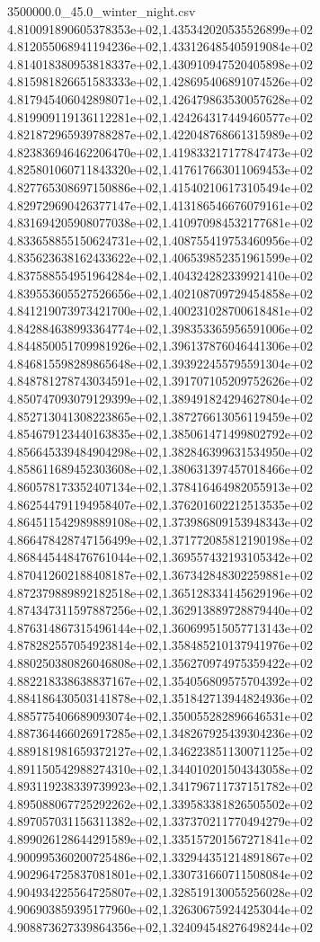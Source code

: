\begin{filecontents*}{3500000.0_45.0_winter_night.csv}
4.810091890605378353e+02,1.435342020535526899e+02
4.812055068941194236e+02,1.433126485405919084e+02
4.814018380953818337e+02,1.430910947520405898e+02
4.815981826651583333e+02,1.428695406891074526e+02
4.817945406042898071e+02,1.426479863530057628e+02
4.819909119136112281e+02,1.424264317449460577e+02
4.821872965939788287e+02,1.422048768661315989e+02
4.823836946462206470e+02,1.419833217177847473e+02
4.825801060711843320e+02,1.417617663011069453e+02
4.827765308697150886e+02,1.415402106173105494e+02
4.829729690426377147e+02,1.413186546676079161e+02
4.831694205908077038e+02,1.410970984532177681e+02
4.833658855150624731e+02,1.408755419753460956e+02
4.835623638162433622e+02,1.406539852351961599e+02
4.837588554951964284e+02,1.404324282339921410e+02
4.839553605527526656e+02,1.402108709729454858e+02
4.841219073973421700e+02,1.400231028700618481e+02
4.842884638993364774e+02,1.398353365956591006e+02
4.844850051709981926e+02,1.396137876046441306e+02
4.846815598289865648e+02,1.393922455795591304e+02
4.848781278743034591e+02,1.391707105209752626e+02
4.850747093079129399e+02,1.389491824294627804e+02
4.852713041308223865e+02,1.387276613056119459e+02
4.854679123440163835e+02,1.385061471499802792e+02
4.856645339484904298e+02,1.382846399631534950e+02
4.858611689452303608e+02,1.380631397457018466e+02
4.860578173352407134e+02,1.378416464982055913e+02
4.862544791194958407e+02,1.376201602212513535e+02
4.864511542989889108e+02,1.373986809153948343e+02
4.866478428747156499e+02,1.371772085812190198e+02
4.868445448476761044e+02,1.369557432193105342e+02
4.870412602188408187e+02,1.367342848302259881e+02
4.872379889892182518e+02,1.365128334145629196e+02
4.874347311597887256e+02,1.362913889728879440e+02
4.876314867315496144e+02,1.360699515057713143e+02
4.878282557054923814e+02,1.358485210137941976e+02
4.880250380826046808e+02,1.356270974975359422e+02
4.882218338638837167e+02,1.354056809575704392e+02
4.884186430503141878e+02,1.351842713944824936e+02
4.885775406689093074e+02,1.350055282896646531e+02
4.887364466026917285e+02,1.348267925439304236e+02
4.889181981659372127e+02,1.346223851130071125e+02
4.891150542988274310e+02,1.344010201504343058e+02
4.893119238339739923e+02,1.341796711737151782e+02
4.895088067725292262e+02,1.339583381826505502e+02
4.897057031156311382e+02,1.337370211770494279e+02
4.899026128644291589e+02,1.335157201567271841e+02
4.900995360200725486e+02,1.332944351214891867e+02
4.902964725837081801e+02,1.330731660711508084e+02
4.904934225564725807e+02,1.328519130055256028e+02
4.906903859395177960e+02,1.326306759244253044e+02
4.908873627339864356e+02,1.324094548276498244e+02

\end{filecontents*}
